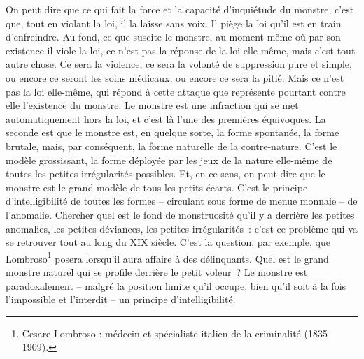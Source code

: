 {

On peut dire que ce qui fait la force et la capacité d'inquiétude du
monstre, c'est que, tout en violant la loi, il la laisse sans voix.
Il piège la loi qu'il est en train d'enfreindre. Au fond, ce que
suscite le monstre, au moment même où par son existence il viole la
loi, ce n'est pas la réponse de la loi elle-même, mais c'est tout
autre chose. Ce sera la violence, ce sera la volonté de suppression
pure et simple, ou encore ce seront les soins médicaux, ou encore ce
sera la pitié. Mais ce n'est pas la loi elle-même, qui répond à cette
attaque que représente pourtant contre elle l'existence du monstre.
Le monstre est une infraction qui se met automatiquement hors la loi,
et c'est là l'une des premières équivoques. La seconde est que le
monstre est, en quelque sorte, la forme spontanée, la forme brutale,
mais, par conséquent, la forme naturelle de la contre-nature. C'est
le modèle grossissant, la forme déployée par les jeux de la nature
elle-même de toutes les petites irrégularités possibles. Et, en ce
sens, on peut dire que le monstre est le grand modèle de tous les
petits écarts. C'est le principe d'intelligibilité de toutes les
formes – circulant sous forme de menue monnaie – de l'anomalie.
Chercher quel est le fond de monstruosité qu'il y a derrière les
petites anomalies, les petites déviances, les petites irrégularités~:
c'est ce problème qui va se retrouver tout au long du XIX\ieme{} siècle.
C'est la question, par exemple, que Lombroso\footnote{Cesare Lombroso
: médecin et spécialiste italien de la criminalité (1835-1909).}
posera lorsqu'il aura affaire à des délinquants. Quel est le grand
monstre naturel qui se profile derrière le petit voleur~? Le monstre
est paradoxalement – malgré la position limite qu'il occupe, bien
qu'il soit à la fois l'impossible et l'interdit – un principe
d'intelligibilité.
}

